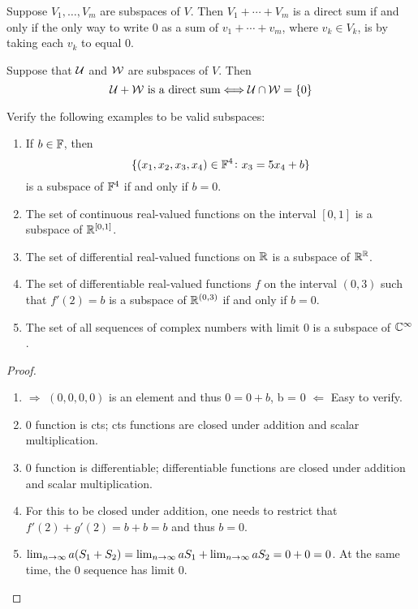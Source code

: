 \documentclass{extarticle}
\begin{document}
\begin{thm}
    Suppose \(V_1, \ldots, V_m\) are subspaces of \(V\). Then \(V_1 + \cdots + V_m\) 
    is a direct sum if and only if the only way to write 0 as a sum of \(v_1 + \cdots + v_m\),
    where \(v_k \in V_k\), is by taking each \(v_k\) to equal 0. 
\end{thm}

\begin{thm}
    Suppose that \(\mathcal{U}\) and \(\mathcal{W}\) are subspaces of \(V\). Then 
    \[\mathcal{U} + \mathcal{W} \text{ is a direct sum} \Longleftrightarrow \mathcal{U} \cap \mathcal{W} = \{0\}\]
\end{thm}

\begin{problem}{1}
Verify the following examples to be valid subspaces:
\begin{enumerate}
    \item If \(b \in \mathbb{F}\), then 
    \[\{(x_1, x_2, x_3, x_4) \in \mathbb{F}^4 \colon x_3 = 5x_4 + b\} \]
    is a subspace of \(\mathbb{F}^4\) if and only if \(b = 0\).
    \item The set of continuous real-valued functions on the interval \([0, 1]\) is 
    a subspace of \(\mathbb{R}^{[0,1]}\). 
    \item The set of differential real-valued functions on \(\mathbb{R}\) is a subspace of \(\mathbb{R}^{\mathbb{R}}\).
    \item The set of differentiable real-valued functions \(f\) on the interval \((0,3)\)
    such that \(f'(2) = b\) is a subspace of \(\mathbb{R}^{(0,3)}\) if and only if \(b=0\).
    \item The set of all sequences of complex numbers with limit 0 is a subspace of \(\mathbb{C}^\infty\).
\end{enumerate}
\end{problem}

\begin{proof}
\begin{enumerate}
    \item \(\Rightarrow\) \((0, 0, 0, 0)\) is an element and thus \(0 = 0 + b\), b = 0 
    \(\Leftarrow\) Easy to verify. 
    \item 0 function is cts; cts functions are closed under addition and scalar multiplication.
    \item 0 function is differentiable; differentiable functions are closed under addition and 
    scalar multiplication. 
    \item For this to be closed under addition, one needs to restrict that \(f'(2) + g'(2) = b + b = b\) and thus 
    \(b = 0\).
    \item \(\lim_{n \to \infty} a(S_1 + S_2) = \lim_{n \to \infty} a S_1 + \lim_{n \to \infty} aS_2 = 0 + 0 = 0\). At the same time, 
    the 0 sequence has limit 0.
\end{enumerate}
\end{proof}
\end{document}
